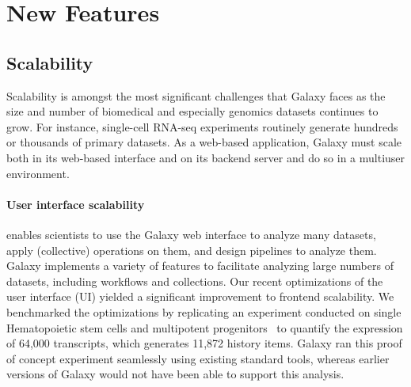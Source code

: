 \section*{New Features}
\subsection*{Scalability}
Scalability is amongst the most significant challenges that Galaxy faces as the size and number of biomedical and especially genomics datasets continues to grow. For instance, single-cell RNA-seq experiments routinely generate hundreds or thousands of primary datasets. As a web-based application, Galaxy must scale both in its web-based interface and on its backend server and do so in a multiuser environment.

\paragraph*{User interface scalability} enables scientists to use the Galaxy web interface to analyze many datasets, apply (collective) operations on them, and design pipelines to analyze them. Galaxy implements a variety of features to facilitate analyzing large numbers of datasets, including workflows and collections. Our recent optimizations of the user interface (UI) yielded a significant improvement to frontend scalability. We benchmarked the optimizations by replicating an experiment conducted on single Hematopoietic stem cells and multipotent progenitors~\cite{yang2016single} to quantify the expression of 64,000 transcripts, which generates 11,872 history items. Galaxy ran this proof of concept experiment seamlessly using existing standard tools, whereas earlier versions of Galaxy would not have been able to support this analysis.

